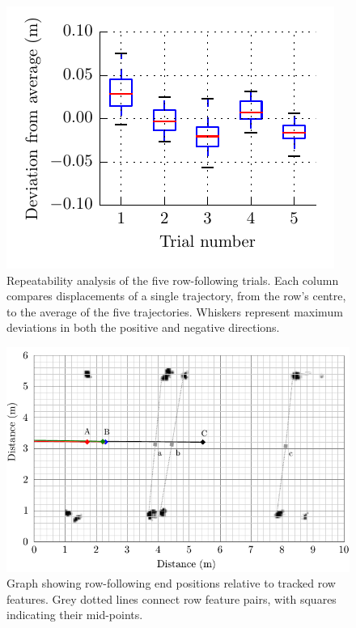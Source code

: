 \documentclass[preprint,authoryear,12pt]{elsarticle}
\begin{document}
    \begin{figure}[htb]
        \centering
        \includegraphics{imgs/slam/row_tracking_repeatability.pdf}
        \caption{
        Repeatability analysis of the five row-following trials.
        Each column compares displacements of a single trajectory, from the row's centre, to the average of the five trajectories.
        Whiskers represent maximum deviations in both the positive and negative directions.
        }
        \label{fig:row_following_repeatability}
    \end{figure}


    \begin{figure}[htb]
        \centering
        \includegraphics{imgs/slam/paths_end_points.pdf}
        \caption{
            Graph showing row-following end positions relative to tracked row features.
            Grey dotted lines connect row feature pairs, with squares indicating their mid-points.
        }
        \label{fig:row_following_end_points}
    \end{figure}
\end{document}
